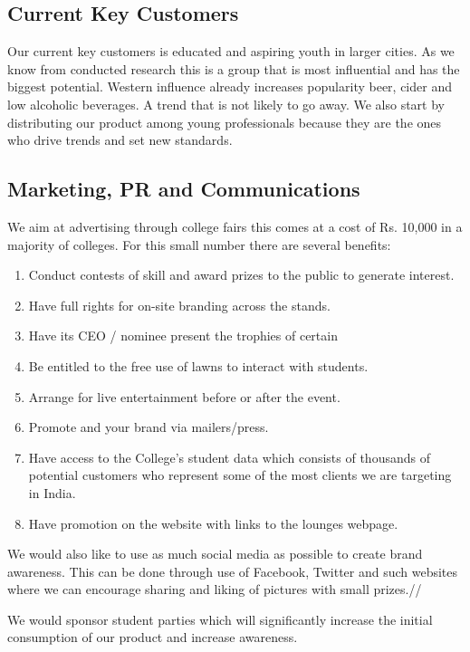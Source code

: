 \documentclass[11pt]{article}
\begin{document}
  \subsection{Current Key Customers}
  Our current key customers is educated and aspiring youth in larger cities.
  As we know from conducted research this is a group that is most influential and has the biggest potential.
  Western influence already increases popularity beer, cider and low alcoholic beverages.
  A trend that is not likely to go away.
  We also start by distributing our product among young professionals because they are the ones who drive trends and set new standards.

  \subsection{Marketing, PR and Communications}
We aim at advertising through college fairs this comes at a cost of Rs. 10,000 in a majority of colleges. For this small number there are several benefits:
\begin{enumerate}
\item Conduct contests of skill and award prizes to the public to generate interest.
\item Have full rights for on-site branding across the stands.
\item Have its CEO / nominee present the trophies of certain 
\item Be entitled to the free use of lawns to interact with students.
\item Arrange for live entertainment before or after the event.
\item Promote and your brand via mailers/press.
\item Have access to the College's student data which consists of thousands of potential customers who represent some of the most clients we are targeting in India.
\item Have promotion on the website with links to the lounges webpage.
\end{enumerate}

We would also like to use as much social media as possible to create brand awareness. This can be done through use of Facebook, Twitter and such websites where we can encourage sharing and liking  of pictures with small prizes.//

We would sponsor student parties which will significantly increase the initial consumption of our product and increase awareness.
\end{document}

